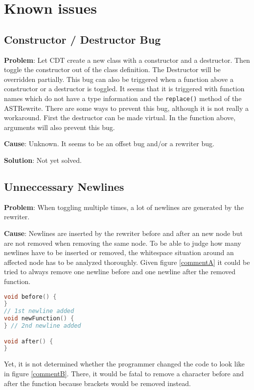 \section{Known issues}

\subsection{Constructor / Destructor Bug}
\textbf{Problem}: Let CDT create a new class with a constructor and a destructor. 
Then toggle the constructor out of the class definition. The Destructor will be 
overridden partially. This bug can also be triggered when a function above a
constructor or a destructor is toggled. It seems that it is triggered with
function names which do not have a type information and the \texttt{replace()}
method of the ASTRewrite.
There are some ways to prevent this bug, although it is not really a workaround.
First the destructor can be made virtual. In the function above, arguments will
also prevent this bug.

\textbf{Cause}: Unknown. It seems to be an offset bug and/or a rewriter bug.

\textbf{Solution}: Not yet solved.

\label{newlines}
\subsection{Unneccessary Newlines}
\textbf{Problem}: When toggling multiple times, a lot of newlines are generated 
by the rewriter. 

\textbf{Cause}: Newlines are inserted by the rewriter before and after an new
node but are not removed when removing the same node. To be able to judge how 
many newlines have to be inserted or removed, the whitespace situation around an 
affected node has to be analyzed thoroughly. Given figure \ref{commentA} it 
could be tried to always remove one newline before and one newline after the 
removed function.

\begin{lstlisting}[caption={Whitespaces will not be removed blindly},
label={commentA}, language=C++]
void before() {
}
// 1st newline added
void newFunction() {
} // 2nd newline added

void after() {
}
\end{lstlisting}

Yet, it is not determined whether the programmer changed the code to look like 
in figure \ref{commentB}. There, it would be fatal to remove a character before 
and after the function because brackets would be removed instead.


